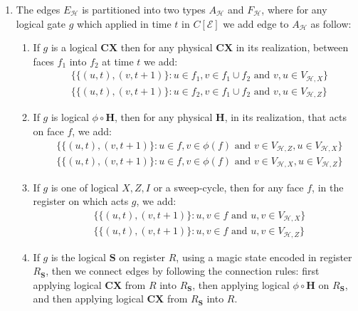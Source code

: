 \begin{definition}
\begin{enumerate}
      \item The edges $E_{\mathcal{H}}$ is partitioned into two types $A_{\mathcal{H}}$ and $F_{\mathcal{H}}$, where for any logical gate $g$ which applied in time $t$ in $C[\mathcal{E}]$ we add edge to $A_{\mathcal{H}}$ as follow: 
        \begin{enumerate}
            \item If $g$ is a logical $\mathbf{CX}$ then for any physical $\mathbf{CX}$ in its realization, between faces $f_{1}$ into $f_{2}$ at time $t$ we add: 
            \begin{equation*}
              \begin{split}
               & \bigl\{  \{(u,t),(v,t+1)\} : u \in f_{1}, v \in f_{1}\cup f_{2} \text{ and } v,u \in V_{\mathcal{H},X} \bigr\} \\
               & \bigl\{  \{(u,t),(v,t+1)\} : u \in f_{2}, v \in f_{1}\cup f_{2} \text{ and } v,u \in V_{\mathcal{H},Z} \bigr\} 
              \end{split}
            \end{equation*}
          \item If $g$ is logical $\phi \circ \mathbf{H}$, then for any physical $\mathbf{H}$, in its realization, that acts on face $f$, we add:
            \begin{equation*}
              \begin{split}
                & \bigl\{  \{(u,t),(v,t+1)\} : u \in f, v \in \phi(f) \text{ and } v \in V_{\mathcal{H},Z} ,u \in V_{\mathcal{H},X} \bigr\} \\
                & \bigl\{  \{(u,t),(v,t+1)\} : u \in f, v \in \phi(f) \text{ and } v \in V_{\mathcal{H},X} ,u \in V_{\mathcal{H},Z} \bigr\} 
              \end{split}
            \end{equation*}
          \item If $g$ is one of logical $X,Z,I$ or a sweep-cycle, then for any face $f$, in the register on which acts $g$, we add: 
            \begin{equation*}
              \begin{split}
                & \bigl\{  \{(u,t),(v,t+1)\} : u,v \in f \text{ and } u,v \in V_{\mathcal{H},X} \bigr\} \\
                & \bigl\{  \{(u,t),(v,t+1)\} : u,v \in f\text{ and } u,v \in V_{\mathcal{H},Z} \bigr\} 
              \end{split}
            \end{equation*}
          \item If $g$ is the logical $\mathbf{S}$ on register $R$, using a magic state encoded in register $R_{\mathbf{S}}$, then we connect edges by following the connection rules: first applying logical $\mathbf{CX}$ from $R$ into $R_{\mathbf{S}}$, then applying logical $\phi \circ \mathbf{H}$ on $R_{\mathbf{S}}$, and then applying logical $\mathbf{CX}$ from $R_{\mathbf{S}}$ into $R$.

\end{enumerate}
\end{enumerate}
\end{definition}
